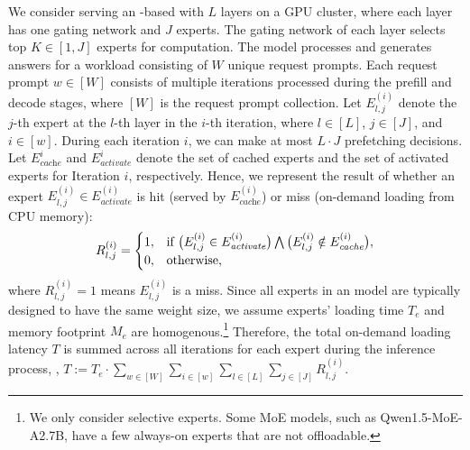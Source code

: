 We consider serving an \MoE-based \LLM with $L$ \MoE layers on a GPU cluster, where each \MoE layer has one gating network and $J$ experts. 
% 
The gating network of each layer selects top $K \in [1, J]$ experts for computation.
The \MoE model processes and generates answers for a workload consisting of $W$ unique request prompts.
%
Each request prompt $w \in [W]$ consists of multiple iterations processed during the prefill and decode stages, where $[W]$ is the request prompt collection.
Let $E^{(i)}_{l, j}$ denote the $j$-th expert at the $l$-th layer in the $i$-th iteration, where $l \in [L]$, $j \in [J]$, and $i \in [w]$.
During each iteration $i$, we can make at most $L \cdot J$ prefetching decisions. 
Let $E^i_{\textit{cache}}$ and $E^i_{\textit{activate}}$ denote the set of cached experts and the set of activated experts for Iteration $i$, respectively.
Hence, we represent the result of whether an expert $E^{(i)}_{l, j} \in E^{(i)}_{\textit{activate}}$ is hit (served by $E^{(i)}_{\textit{cache}}$) or miss (on-demand loading from CPU memory):
\begin{equation*}
  R^{(i)}_{l, j} = 
  \begin{cases}
    1, & \text{if \big{(}$E^{(i)}_{l, j} \in E^{(i)}_{\textit{activate}}\big{)} \bigwedge \big{(}E^{(i)}_{l, j} \notin E^{(i)}_{\textit{cache}}\big{)}$}, \\
    0, & \text{otherwise},
  \end{cases}
\end{equation*}
where $R^{(i)}_{l, j} = 1$ means $E^{(i)}_{l, j}$ is a miss.
Since all experts in an \MoE model are typically designed to have the same weight size, we assume experts' loading time $T_e$ and memory footprint $M_e$ are homogenous.\footnote{We only consider selective experts. Some MoE models, such as Qwen1.5-MoE-A2.7B, have a few always-on experts that are not offloadable.}
%
Therefore, the total on-demand loading latency $T$ is summed across all iterations for each expert during the inference process, \ie, $T := T_e \cdot \sum_{w \in [W]} \sum_{i \in [w]} \sum_{l \in [L]} \sum_{j \in [J]} R^{(i)}_{l,j}$.

